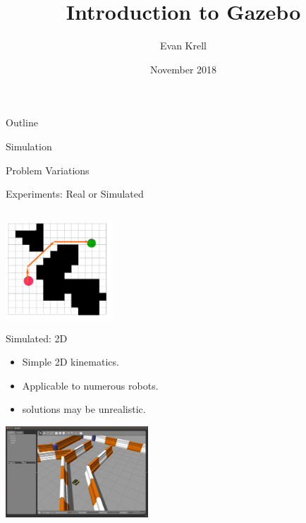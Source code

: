 \documentclass[9pt]{beamer}
\title[PPT - Gazebo Intro]{Introduction to Gazebo}
\author{Evan Krell}
\institute{Texas A\&M University - Corpus Christi}
\date{November 2018}
\begin{document}
\begin{frame}
  \titlepage
\end{frame}

\begin{frame}{Outline}
  \tableofcontents
\end{frame}


\begin{section}{Simulation}
    \begin{frame}{Problem Variations} \label{frame:experiments}
        \begin{block}{Experiments: Real or Simulated}
            \begin{columns}
                \begin{column}{0.5\textwidth}
                    \begin{center}
                    \includegraphics[width=0.3\textwidth,trim={0cm 0cm 0cm 0cm},clip]{exp_2d.png}
                    \end{center}
                    \begin{block}{Simulated: 2D}
                        \begin{itemize}
                            \item Simple 2D kinematics.
                            \item Applicable to numerous robots.
                            \item solutions may be unrealistic.
                        \end{itemize}
                    \end{block}
                    \begin{center}
                    \includegraphics[width=0.4\textwidth,trim={0cm 0cm 0cm 0cm},clip]{exp_3d.png}
                    \end{center}

\end{column}
\end{columns}
\end{block}
\end{frame}
\end{section}
\end{document}
